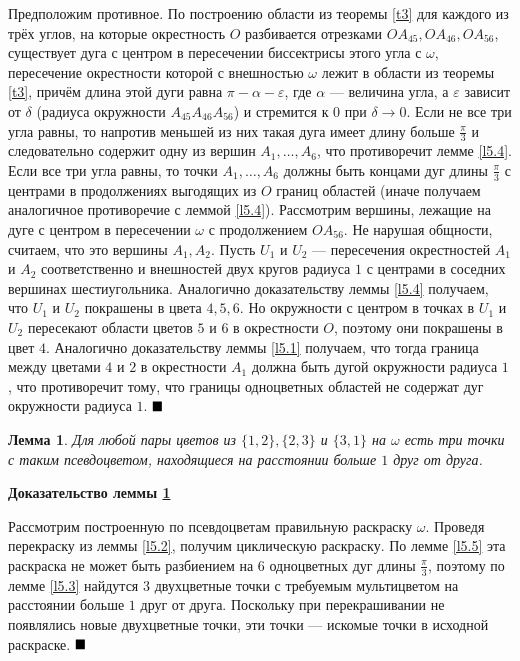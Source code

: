 \documentclass[12pt,a4paper]{article}
\newtheorem{lemma}{Лемма}
\renewcommand{\qed}{$\blacksquare \vspace{5mm}$}
\begin{document}
Предположим противное. По построению области из теоремы \ref{t3} для каждого из трёх углов, на которые окрестность $O$ разбивается отрезками $OA_{45}, OA_{46}, OA_{56}$, существует дуга с центром в пересечении биссектрисы этого угла с $\omega$, пересечение окрестности которой с внешностью $\omega$ лежит в области из теоремы \ref{t3}, причём длина этой дуги равна $\pi - \alpha - \varepsilon$, где $\alpha$ --- величина угла, а $\varepsilon$ зависит от $\delta$ (радиуса окружности $A_{45}A_{46}A_{56}$) и стремится к $0$ при $\delta \rightarrow 0$. Если не все три угла равны, то напротив меньшей из них такая дуга имеет длину больше $\frac{\pi}{3}$ и следовательно содержит одну из вершин $A_1, \ldots, A_6$, что противоречит лемме \ref{l5.4}. Если все три угла равны, то точки $A_1, \ldots, A_6$ должны быть концами дуг длины $\frac{\pi}{3}$ с центрами в продолжениях выгодящих из $O$ границ областей (иначе получаем аналогичное противоречие с леммой \ref{l5.4}). Рассмотрим вершины, лежащие на дуге с центром в пересечении $\omega$ с продолжением $OA_{56}$. Не нарушая общности, считаем, что это вершины $A_1, A_2$. Пусть $U_1$ и $U_2$ --- пересечения окрестностей $A_1$ и $A_2$ соответственно и внешностей двух кругов радиуса $1$ с центрами в соседних вершинах шестиугольника. Аналогично доказательству леммы \ref{l5.4} получаем, что $U_1$ и $U_2$ покрашены в цвета $4, 5, 6$. Но окружности с центром в точках в $U_1$ и $U_2$ пересекают области цветов $5$ и $6$ в окрестности $O$, поэтому они покрашены в цвет $4$. Аналогично доказательству леммы \ref{l5.1} получаем, что тогда граница между цветами $4$ и $2$ в окрестности $A_1$ должна быть дугой окружности радиуса $1$, что противоречит тому, что границы одноцветных областей не содержат дуг окружности радиуса $1$. \qed

\begin{lemma} \label{l5.6}
	Для любой пары цветов из $\{1, 2\}, \{2, 3\}$ и $\{3, 1\}$ на $\omega$ есть три точки с таким псевдоцветом, находящиеся на расстоянии больше $1$ друг от друга.
\end{lemma}

\textbf{Доказательство леммы \ref{l5.6}}

Рассмотрим построенную по псевдоцветам правильную раскраску $\omega$. Проведя перекраску из леммы \ref{l5.2}, получим циклическую раскраску. По лемме \ref{l5.5} эта раскраска не может быть разбиением на $6$ одноцветных дуг длины $\frac{\pi}{3}$, поэтому по лемме \ref{l5.3} найдутся $3$ двухцветные точки с требуемым мультицветом на расстоянии больше $1$ друг от друга. Поскольку при перекрашивании не появлялись новые двухцветные точки, эти точки --- искомые точки в исходной раскраске. \qed
\end{document}
